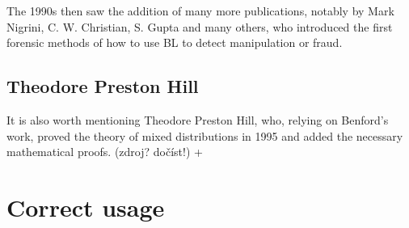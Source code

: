 
The 1990s then saw the addition of many more publications, notably by Mark Nigrini, C. W. Christian, S. Gupta and many others, who introduced the first forensic methods of how to use BL to detect manipulation or fraud. \cite{kossovsky2014benford} %

 \subsection{Theodore Preston Hill}


It is also worth mentioning Theodore Preston Hill, who, relying on Benford's work, proved the theory of mixed distributions in 1995 and added the necessary mathematical proofs. {\color{blue}(zdroj? dočíst!)} + \cite{kossovsky2014benford} %





\section{Correct usage}

